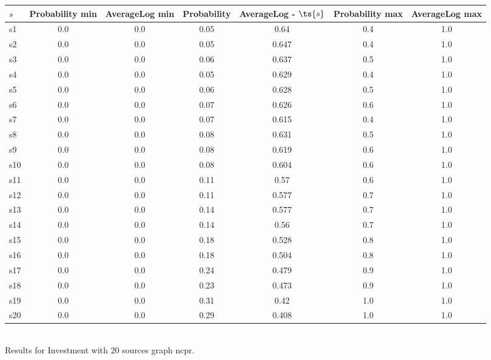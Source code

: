 \documentclass{article}
\begin{document}
\noindent\begin{tabular}{|l|c|c|c|c|c|c|}
\hline
$s$& Probability min & AverageLog min & Probability & AverageLog - $\ts{s}$ & Probability max & AverageLog max\\
\hline
s1 &0.0 & 0.0 & 0.05 & 0.64 & 0.4 & 1.0\\
\hline
s2 &0.0 & 0.0 & 0.05 & 0.647 & 0.4 & 1.0\\
\hline
s3 &0.0 & 0.0 & 0.06 & 0.637 & 0.5 & 1.0\\
\hline
s4 &0.0 & 0.0 & 0.05 & 0.629 & 0.4 & 1.0\\
\hline
s5 &0.0 & 0.0 & 0.06 & 0.628 & 0.5 & 1.0\\
\hline
s6 &0.0 & 0.0 & 0.07 & 0.626 & 0.6 & 1.0\\
\hline
s7 &0.0 & 0.0 & 0.07 & 0.615 & 0.4 & 1.0\\
\hline
s8 &0.0 & 0.0 & 0.08 & 0.631 & 0.5 & 1.0\\
\hline
s9 &0.0 & 0.0 & 0.08 & 0.619 & 0.6 & 1.0\\
\hline
s10 &0.0 & 0.0 & 0.08 & 0.604 & 0.6 & 1.0\\
\hline
s11 &0.0 & 0.0 & 0.11 & 0.57 & 0.6 & 1.0\\
\hline
s12 &0.0 & 0.0 & 0.11 & 0.577 & 0.7 & 1.0\\
\hline
s13 &0.0 & 0.0 & 0.14 & 0.577 & 0.7 & 1.0\\
\hline
s14 &0.0 & 0.0 & 0.14 & 0.56 & 0.7 & 1.0\\
\hline
s15 &0.0 & 0.0 & 0.18 & 0.528 & 0.8 & 1.0\\
\hline
s16 &0.0 & 0.0 & 0.18 & 0.504 & 0.8 & 1.0\\
\hline
s17 &0.0 & 0.0 & 0.24 & 0.479 & 0.9 & 1.0\\
\hline
s18 &0.0 & 0.0 & 0.23 & 0.473 & 0.9 & 1.0\\
\hline
s19 &0.0 & 0.0 & 0.31 & 0.42 & 1.0 & 1.0\\
\hline
s20 &0.0 & 0.0 & 0.29 & 0.408 & 1.0 & 1.0\\
\hline
\end{tabular}\\

\noindent Results for Investment with 20 sources graph ncpr.
\end{document}
